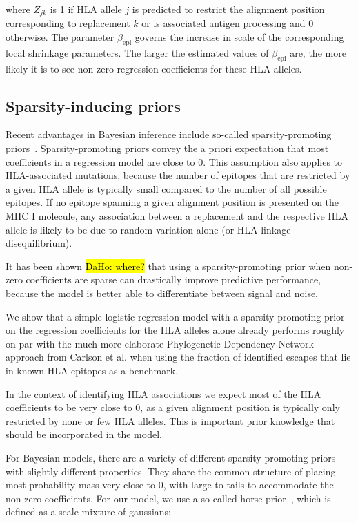 \documentclass{bioinfo}
\begin{document}
\begin{methods}
where \(Z_{jk}\) is 1 if HLA allele \(j\) is predicted to restrict the alignment position corresponding to replacement \(k\) or is associated antigen processing and 0 otherwise.
The parameter \(\beta_{\text{epi}}\) governs the increase in scale of the  corresponding local shrinkage parameters. The larger the estimated values of \(\beta_{\text{epi}}\) are, the more likely it is to see non-zero regression coefficients for these HLA alleles.

\subsection{Sparsity-inducing priors}
  
  Recent advantages in Bayesian inference include so-called sparsity-promoting priors~\citep{Piironen2017}. Sparsity-promoting priors convey the a priori expectation that most coefficients in a regression model are close to 0. This assumption also applies to HLA-associated mutations, because the number of epitopes that are restricted by a given HLA allele is typically small compared to the number of all possible epitopes. If no epitope spanning a given alignment position is presented on the MHC I molecule, any association between a replacement and the respective HLA allele  is likely to be due to random variation alone (or HLA linkage disequilibrium).
  
  It has been shown \hl{DaHo: where?} that using a sparsity-promoting prior when non-zero coefficients are sparse can drastically improve predictive performance, because the model is better able to differentiate between signal and noise.

  We show that a simple logistic regression model with a sparsity-promoting prior on the regression coefficients for the HLA alleles alone already performs roughly on-par  with the much more elaborate Phylogenetic Dependency Network approach from Carlson et al. when using the fraction of identified escapes that lie in known HLA epitopes as a benchmark.

In the context of identifying HLA associations we expect most of the HLA coefficients to be very close to 0, as a given alignment position is typically only restricted by none or few HLA alleles.
This is important prior knowledge that should be incorporated in the model.

For Bayesian models, there are a variety of different sparsity-promoting priors with slightly different properties. They share the common structure of placing most probability mass very close to 0, with large to tails to accommodate the non-zero coefficients.
For our model, we use a so-called horse prior~\citep{Carvalho2010}, which is defined as a scale-mixture of gaussians:


\end{methods}
\end{document}
